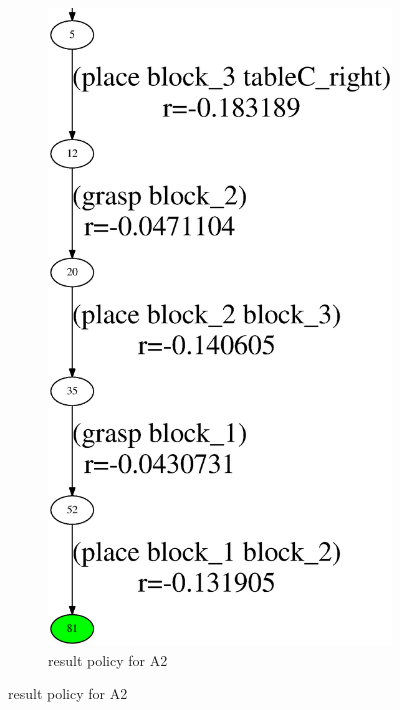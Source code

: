 \documentclass[conference]{IEEEtran}
\begin{document}
\begin{figure}[h!]
\begin{subfigure}[t]{0.16\textwidth}
      \includegraphics[width=\textwidth]{data/1m2/-0.25/10/policy-2-final.eps}
  \caption{result policy for A2}
  \end{subfigure}
\label{fig:policy}
\end{figure}
\end{document}
